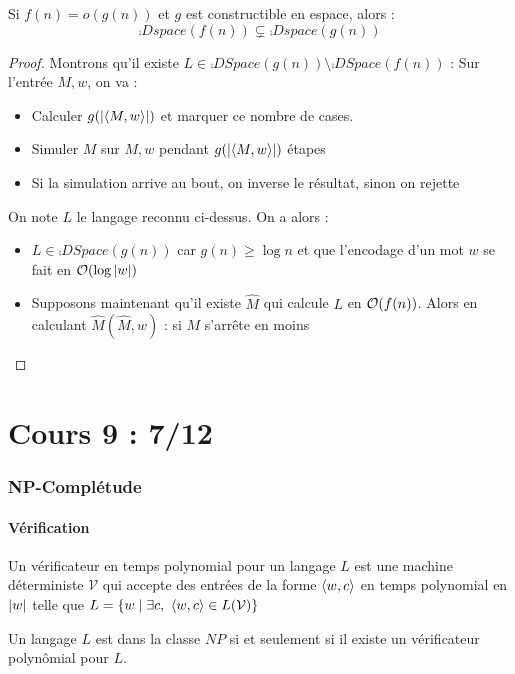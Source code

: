 \documentclass{cours}
\begin{document}
\begin{theorem}
    Si $f(n) = o(g(n))$ et $g$ est constructible en espace, alors : 
    \[
        \comp{Dspace}(f(n)) \subsetneq \comp{Dspace}(g(n))
    \]
\end{theorem}
\begin{proof}
    Montrons qu'il existe $L \in \comp{DSpace}(g(n)) \setminus \comp{DSpace}(f(n))$ : Sur l'entrée $M, w$, on va : 
    \begin{itemize}
        \item Calculer $g(\left|\left\langle M, w \right\rangle\right|)$ et marquer ce nombre de cases.
        \item Simuler $M$ sur $M, w$ pendant $g(\left|\left\langle M, w \right\rangle\right|)$ étapes
        \item Si la simulation arrive au bout, on inverse le résultat, sinon on rejette
    \end{itemize}
    On note $L$ le langage reconnu ci-dessus. On a alors : 
    \begin{itemize}
        \item $L \in \comp{DSpace}(g(n))$ car $g(n) \geq \log n$ et que l'encodage d'un mot $w$ se fait en $\mathcal{O}(\log \left|w\right|)$
        \item Supposons maintenant qu'il existe $\hat{M}$ qui calcule $L$ en $\mathcal{O}(f(n))$. Alors en calculant $\hat{M}(\hat{M}, w)$ : si $M$ s'arrête en moins   
    \end{itemize}
\end{proof}

\part[NP-Complétude]{Cours 9 : 7/12}
\section{NP-Complétude}

\subsection{Vérification}
\begin{definition}
    Un vérificateur en temps polynomial pour un langage $L$ est une machine déterministe $\mathcal{V}$ qui accepte des entrées de la forme $\left\langle w, c \right\rangle$ en temps polynomial en $\left|w\right|$ telle que $L = \left\{w \mid \exists c, \ \left\langle w, c \right\rangle \in L(\mathcal{V})\right\}$
\end{definition}

\begin{theorem}
    Un langage $L$ est dans la classe $NP$ si et seulement si il existe un vérificateur polynômial pour $L$. 
\end{theorem}
\end{document}

